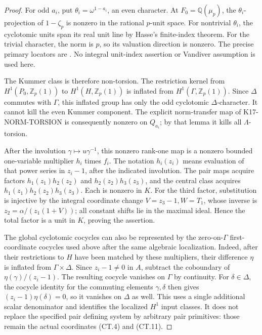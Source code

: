 \begin{proof}
For odd \(a_i\), put \(\theta_i=\omega^{1-a_i}\), an even
character. At \(F_0=\mathbb Q(\mu_p)\), the \(\theta_i\)-projection
of \(1-\zeta_p\) is nonzero in the rational \(p\)-unit space.
For nontrivial \(\theta_i\), the cyclotomic units span its real
unit line by Hasse's finite-index theorem. For the trivial character,
the norm is \(p\), so its valuation direction is nonzero. The
precise primary locators are \cite[Theorem~4.3.3 and its proof,
pp.~108--109; Proposition~6.1.5 and its proof,
p.~152]{SharifiIwasawaFull2026}. No integral unit-index assertion or
Vandiver assumption is used here.

The Kummer class is therefore non-torsion. The restriction kernel
from \(H^1(P_0,\mathbb Z_p(1))\) to \(H^1(H,\mathbb Z_p(1))\)
is inflated from \(H^1(\Gamma,\mathbb Z_p(1))\). Since
\(\Delta\) commutes with \(\Gamma\), this inflated group has
only the odd cyclotomic \(\Delta\)-character. It cannot kill the
even Kummer component. The explicit norm-transfer map of
K17-NORM-TORSION is consequently nonzero on \(Q_{a_i}\); by that
lemma it kills all \(\Lambda\)-torsion.

After the involution \(\gamma\mapsto u\gamma^{-1}\), this
nonzero rank-one map is a nonzero bounded one-variable multiplier
\(h_i\) times \(f_i\). The notation \(h_i(z_i)\) means evaluation
of that power series in \(z_i-1\), after the indicated involution.
The pair maps acquire factors \(h_1(z_1)h_2(z_2)\) and
\(h_2(z_2)h_3(z_3)\), and the central class acquires
\(h_1(z_1)h_2(z_2)h_3(z_3)\). Each is nonzero in \(K\).
For the third factor, substitution is injective by the integral
coordinate change \(V=z_3-1,W=T_1\), whose inverse is
\(z_2=\alpha/(z_1(1+V))\); all constant shifts lie in the
maximal ideal. Hence the total factor is a unit in \(K\), proving
the assertion.

The global cyclotomic cocycles can also be represented by the
zero-on-\(\Gamma\) first-coordinate cocycles used above after the
same algebraic localization. Indeed, after their restrictions to
\(H\) have been matched by these multipliers, their difference
\(\eta\) is inflated from \(\Gamma\times\Delta\). Since
\(z_i-1\ne0\) in \(A\), subtract the coboundary of
\(\eta(\gamma)/(z_i-1)\). The resulting cocycle vanishes on
\(\Gamma\) by continuity. For \(\delta\in\Delta\), the
cocycle identity for the commuting elements \(\gamma,\delta\)
then gives \((z_i-1)\eta(\delta)=0\), so it vanishes on
\(\Delta\) as well. This uses a single additional scalar
denominator and identifies the localized \(H^1\) input classes.
It does not replace the specified pair defining system by arbitrary
pair primitives: those remain the actual coordinates (CT.4) and
(CT.11).
\end{proof}

